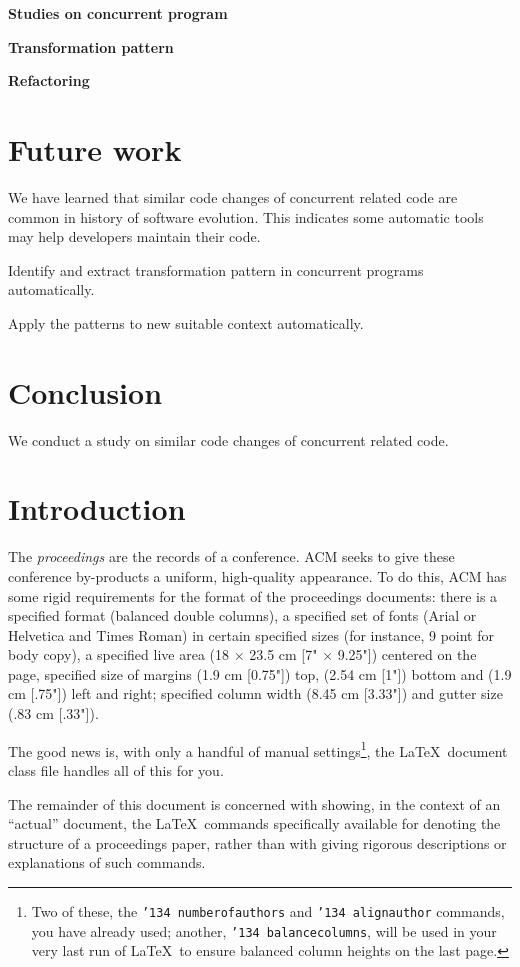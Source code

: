 \documentclass{sig-alternate-05-2015}
\begin{document}
\textbf{Studies on concurrent program}

\textbf{Transformation pattern}

\textbf{Refactoring}

\section{Future work}
We have learned that similar code changes of concurrent related code are common in history of software evolution. This indicates some automatic tools may help developers maintain their code. 

Identify and extract transformation pattern in concurrent programs automatically.

Apply the patterns to new suitable context automatically.

\section{Conclusion}
We conduct a study on similar code changes of concurrent related code.

\section{Introduction}

The \textit{proceedings} are the records of a conference.
ACM seeks to give these conference by-products a uniform,
high-quality appearance.  To do this, ACM has some rigid
requirements for the format of the proceedings documents: there
is a specified format (balanced  double columns), a specified
set of fonts (Arial or Helvetica and Times Roman) in
certain specified sizes (for instance, 9 point for body copy),
a specified live area (18 $\times$ 23.5 cm [7" $\times$ 9.25"]) centered on
the page, specified size of margins (1.9 cm [0.75"]) top, (2.54 cm [1"]) bottom
and (1.9 cm [.75"]) left and right; specified column width
(8.45 cm [3.33"]) and gutter size (.83 cm [.33"]).

The good news is, with only a handful of manual
settings\footnote{Two of these, the {\texttt{\char'134 numberofauthors}}
and {\texttt{\char'134 alignauthor}} commands, you have
already used; another, {\texttt{\char'134 balancecolumns}}, will
be used in your very last run of \LaTeX\ to ensure
balanced column heights on the last page.}, the \LaTeX\ document
class file handles all of this for you.

The remainder of this document is concerned with showing, in
the context of an ``actual'' document, the \LaTeX\ commands
specifically available for denoting the structure of a
proceedings paper, rather than with giving rigorous descriptions
or explanations of such commands.
\end{document}
